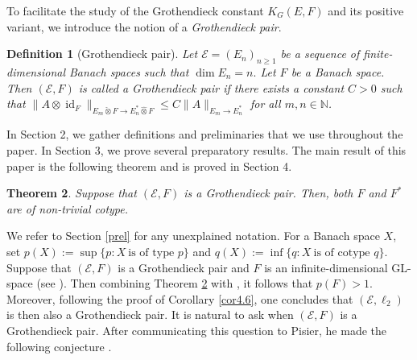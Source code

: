 \documentclass[a4paper,oneside,11pt, reqno]{amsart}
\numberwithin{equation}{section}
\newtheorem{theorem}{Theorem}[section]
\newtheorem{definition}[theorem]{Definition}
\theoremstyle{plain}
\begin{document}
To facilitate the study of the Grothendieck constant $K_G(E,F)$ and its positive variant, we introduce the notion 
of a \textit{Grothendieck pair}. 

\begin{definition}[Grothendieck pair]\label{GTPDEF} Let $\mathcal{E}=(E_n)_{n\geqslant 1}$ be a sequence of finite-dimensional Banach spaces such that $\dim E_n=n.$ Let $F$ be a Banach space. Then $(\mathcal{E}, F)$ is called a {\textit Grothendieck pair} if there exists a constant $C>0$ such that $\|A\otimes \operatorname{id}_{F}\|_{E_m\check{\otimes}F\to E_n^*\hat{\otimes}F}\leqslant C \|A\|_{E_m\to E_n^*}$ for all  $m,n\in\mathbb{N}$. \end{definition}

 In Section 2, we gather definitions and preliminaries that we use throughout the paper. In Section 3, we prove several preparatory results. The main result of this paper is the following theorem and is proved in Section 4. 
\begin{theorem}\label{mainthm}
 Suppose that $(\mathcal E, F)$  is a Grothendieck pair. Then, both $F$ and $F^*$ are of non-trivial cotype.
\end{theorem} 
We refer to Section \ref{prel} for any unexplained notation.
 For a Banach space $X$, set $p(X):=\sup\{p:X\ \text{is of type }p\}$ and $q(X):=\inf\{q:X\ \text{is of cotype } q\}$.
 Suppose that  $(\mathcal E, F)$  is a Grothendieck pair and $F$ is an infinite-dimensional GL-space (see \cite[pp. 350]{DJT}). 
Then combining Theorem \ref{mainthm} with \cite[Theorem 17.13]{DJT}, it follows that
$p(F)>1$. Moreover, following the proof of Corollary \ref{cor4.6}, one concludes that $(\mathcal E,\ell_2)$ is then also a Grothendieck pair. 
It is natural to ask when $(\mathcal{E},F)$ is a Grothendieck pair. After communicating this question to Pisier, he made the following conjecture \cite{Pisier17}.
\end{document}
